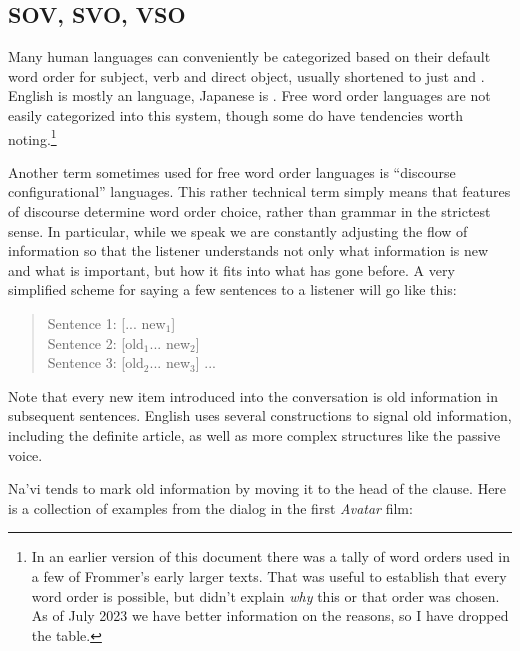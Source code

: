 \subsection{SOV, SVO, VSO} Many human languages can conveniently be
categorized based on their default word order for subject, verb and
direct object, usually shortened to just  and .  English
is mostly an  language, Japanese is .  Free word order
languages are not easily categorized into this system, though some do
have tendencies worth noting.\footnote{In an earlier version of this
document there was a tally of word orders used in a few of Frommer's
early larger texts.  That was useful to establish that every word
order is possible, but didn't explain \textit{why} this or that order
was chosen.  As of July 2023 we have better information on the
reasons, so I have dropped the table.}

Another term sometimes used for free word order languages is
``discourse configurational'' languages.  This rather technical term
simply means that features of discourse determine word order choice,
rather than grammar in the strictest sense.  In particular, while we
speak we are constantly adjusting the flow of information so that the
listener understands not only what information is new and what is
important, but how it fits into what has gone before.  A very
simplified scheme for saying a few sentences to a listener will go
like this:

\begin{quotation}
\noindent Sentence 1: [... new$_1$]\\
Sentence 2: [old$_1$... new$_2$]\\
Sentence 3: [old$_2$... new$_3$] ...
\end{quotation}

\noindent Note that every new item introduced into the conversation
is old information in subsequent sentences.  English uses several
constructions to signal old information, including the definite
article,  as well as more complex structures like the passive
voice.

Na'vi tends to mark old information by moving it to the head of the
clause.  Here is a collection of examples from the dialog in the
first \textit{Avatar} film:


